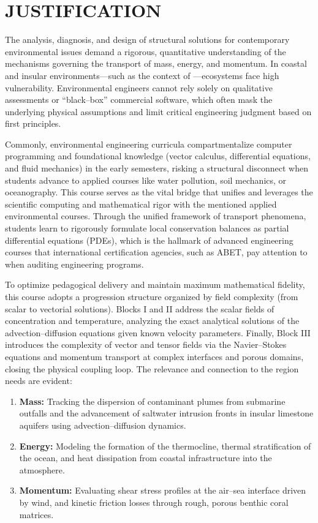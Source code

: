 \section{JUSTIFICATION}
The analysis, diagnosis, and design of structural solutions for contemporary environmental issues demand a rigorous, quantitative understanding of the mechanisms governing the transport of mass, energy, and momentum. In coastal and insular environments---such as the \Region context of \Institution---ecosystems face high vulnerability. Environmental engineers cannot rely solely on qualitative assessments or ``black--box'' commercial software, which often mask the underlying physical assumptions and limit critical engineering judgment based on first principles.

Commonly, environmental engineering curricula compartmentalize computer programming and foundational knowledge (vector calculus, differential equations, and fluid mechanics) in the early semesters, risking a structural disconnect when students advance to applied courses like water pollution, soil mechanics, or oceanography. This course serves as the vital bridge that unifies and leverages the scientific computing and mathematical rigor with the mentioned applied environmental courses. Through the unified framework of transport phenomena, students learn to rigorously formulate local conservation balances as partial differential equations (PDEs), which is the hallmark of advanced engineering courses that international certification agencies, such as ABET, pay attention to when auditing engineering programs.

To optimize pedagogical delivery and maintain maximum mathematical fidelity, this course adopts a {progression structure organized by field complexity (from scalar to vectorial solutions)}. Blocks I and II address the scalar fields of concentration and temperature, analyzing the exact analytical solutions of the advection--diffusion equations given known velocity parameters. Finally, Block III introduces the complexity of vector and tensor fields via the Navier--Stokes equations and momentum transport at complex interfaces and porous domains, closing the physical coupling loop. The relevance and connection to the \Region region needs are evident:
\begin{enumerate}
    \item \textbf{Mass:} Tracking the dispersion of contaminant plumes from submarine outfalls and the advancement of saltwater intrusion fronts in insular limestone aquifers using advection--diffusion dynamics.
    \item \textbf{Energy:} Modeling the formation of the thermocline, thermal stratification of the ocean, and heat dissipation from coastal infrastructure into the atmosphere.
    \item \textbf{Momentum:} Evaluating shear stress profiles at the air--sea interface driven by wind, and kinetic friction losses through rough, porous benthic coral matrices.
\end{enumerate}

